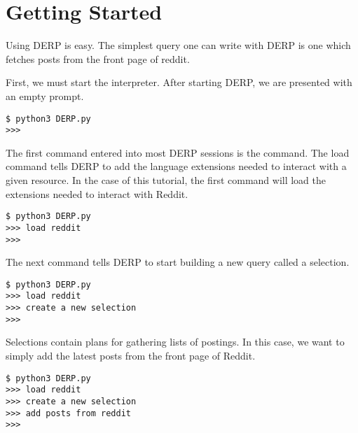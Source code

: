 \section{Getting Started}
Using DERP is easy. The simplest query one can write with DERP is one which fetches posts from the front page of reddit.

First, we must start the interpreter. After starting DERP, we are presented with an empty prompt.
\newline\begin{minipage}{\linewidth}\begin{lstlisting}
$ python3 DERP.py
>>>
\end{lstlisting}\end{minipage}



The first command entered into most DERP sessions is the  command. The load command tells DERP to add the language
extensions needed to interact with a given resource. In the case of this tutorial, the first command will load the
extensions needed to interact with Reddit.
\newline\begin{minipage}{\linewidth}\begin{lstlisting}
$ python3 DERP.py
>>> load reddit
>>>
\end{lstlisting}\end{minipage}



The next command tells DERP to start building a new query called a selection.
\newline\begin{minipage}{\linewidth}\begin{lstlisting}
$ python3 DERP.py
>>> load reddit
>>> create a new selection
>>>
\end{lstlisting}\end{minipage}



Selections contain plans for gathering lists of postings. In this case, we want to simply add the latest posts from the front page of Reddit.
\newline\begin{minipage}{\linewidth}\begin{lstlisting}
$ python3 DERP.py
>>> load reddit
>>> create a new selection
>>> add posts from reddit
>>>
\end{lstlisting}\end{minipage}



